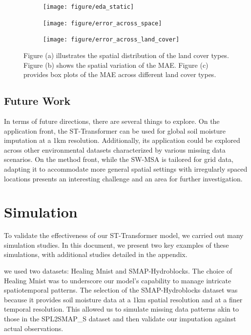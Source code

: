 \documentclass[11pt]{article}
\begin{document}
\begin{figure}[H]
     \centering
      \begin{subfigure}[b]{0.45\textwidth}
		\centering
		\texttt{[image: figure/eda\_static]}
		\caption{}
		\label{fig: missing at time points}
	 \end{subfigure}
         \hfill
      \begin{subfigure}[b]{0.45\textwidth}
         \texttt{[image: figure/error\_across\_space]}
		 \caption{}
	\label{fig: missing at random}
     \end{subfigure}
     
    \begin{subfigure}[b]{\textwidth}
	\texttt{[image: figure/error\_across\_land\_cover]}
	\end{subfigure}
    
     \caption{Figure (a) illustrates the spatial distribution of the land cover types. Figure (b) shows the spatial variation of the MAE. Figure (c) provides box plots of the MAE across different land cover types.}
     \label{fig: mae_across_space}
\end{figure}






\subsection{Future Work}
In terms of future directions, there are several things to explore. On the application front, the ST-Transformer can be used for global soil moisture imputation at a 1km resolution. Additionally, its application could be explored across other environmental datasets characterized by various missing data scenarios. On the method front, while the SW-MSA is tailored for grid data, adapting it to accommodate more general spatial settings with irregularly spaced locations presents an interesting challenge and an area for further investigation.





\section{Simulation} 
To validate the effectiveness of our ST-Transformer model, we carried out many simulation studies. In this document, we present two key examples of these simulations, with additional studies detailed in the appendix.

we used two datasets: Healing Mnist and SMAP-Hydroblocks. The choice of Healing Mnist was to underscore our model's capability to manage intricate spatiotemporal patterns. The selection of the SMAP-Hydroblocks dataset was because it provides soil moisture data at a 1km spatial resolution and at a finer temporal resolution. This allowed us to simulate missing data patterns akin to those in the SPL2SMAP\_S dataset and then validate our imputation against actual observations.
\end{document}
